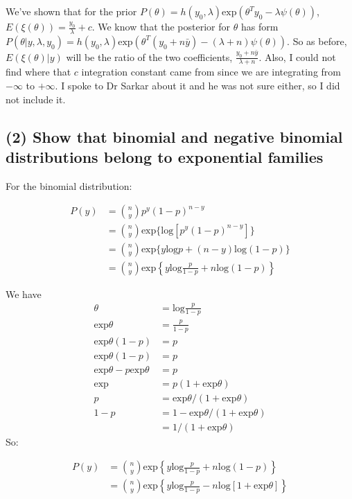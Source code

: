\documentclass[11pt]{article}
\begin{document}
We've shown that for the prior $P(\theta) = h(y_0, \lambda)\text{exp}(\theta^T y_0 - \lambda \psi(\theta))$, $E(\xi(\theta)) = \frac{y_0}{\lambda} + c$. We know that the posterior for $\theta$ has form $P(\theta|y, \lambda, y_0) =  h(y_0, \lambda)\text{exp}(\theta^T(y_0 + n\bar{y}) - (\lambda + n) \psi(\theta))$. So as before, $E(\xi(\theta)|y)$ will be the ratio of the two coefficients, $\frac{y_0+n\bar{y}}{\lambda+n}$. Also, I could not find where that $c$ integration constant came from since we are integrating from $-\infty$ to $+\infty$. I spoke to Dr Sarkar about it and he was not sure either, so I did not include it.


\subsection*{(2) Show that binomial and negative binomial distributions belong to exponential families}

For the binomial distribution:

\begin{align*}
    P(y) &= {n \choose y}p^y(1-p)^{n-y}\\
    &=  {n \choose y}\text{exp}\{\text{log}[p^y(1-p)^{n-y}]\}\\
     &=  {n \choose y}\text{exp}\{y\text{log}p +(n-y)\text{log}(1-p)\}\\
     &=  {n \choose y}\text{exp}\left \{y\text{log}\frac{p}{1-p} +n\text{log}(1-p)\right \}
\end{align*}

We have 
\begin{align*}
    \theta &= \text{log}\frac{p}{1-p} \\
    \text{exp}\theta &= \frac{p}{1-p} \\
     \text{exp}\theta(1-p) &=p \\
      \text{exp}\theta(1-p) &=p \\
      \text{exp}\theta - p\text{exp}\theta &=p \\
            \text{exp}  &=p(1+\text{exp}\theta) \\
             p  &=\text{exp}\theta/(1+\text{exp}\theta) \\
               1-p  &=1-\text{exp}\theta/(1+\text{exp}\theta) \\
               &=1/(1+\text{exp}\theta) 
\end{align*}
So:

\begin{align*}
    P(y) &=  {n \choose y}\text{exp}\left \{y\text{log}\frac{p}{1-p} +n\text{log}(1-p)\right \}\\
    &=  {n \choose y}\text{exp}\left \{y\text{log}\frac{p}{1-p} -n\text{log}[1+\text{exp}\theta]\right \}
\end{align*}
\end{document}
